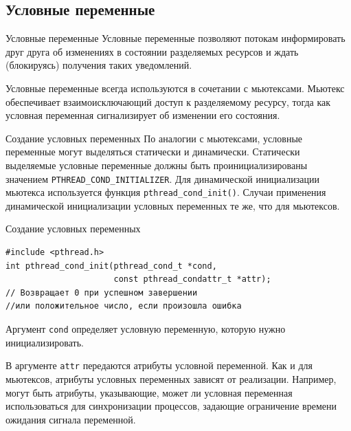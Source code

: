\documentclass{beamer}
\begin{document}
\subsection{Условные переменные}

\begin{frame}{Условные переменные}
    Условные переменные позволяют потокам информировать друг друга об изменениях в состоянии разделяемых ресурсов и ждать (блокируясь) получения таких уведомлений.
    
    Условные переменные всегда используются в сочетании с мьютексами. Мьютекс обеспечивает взаимоисключающий доступ к разделяемому ресурсу, тогда как условная переменная сигнализирует об изменении его состояния.
\end{frame}

\begin{frame}{Создание условных переменных}
    По аналогии с мьютексами, условные переменные могут выделяться статически и динамически. Статически выделяемые условные переменные должны быть проинициализированы значением \texttt{PTHREAD\_COND\_INITIALIZER}. Для динамической инициализации мьютекса используется функция \texttt{pthread\_cond\_init()}. Случаи применения динамической инициализации условных переменных те же, что для мьютексов. 
\end{frame}

\begin{frame}[fragile]{Создание условных переменных}
    \begin{verbatim}
#include <pthread.h>
int pthread_cond_init(pthread_cond_t *cond, 
                      const pthread_condattr_t *attr);
// Возвращает 0 при успешном завершении 
//или положительное число, если произошла ошибка
    \end{verbatim}
    
    Аргумент \texttt{cond} определяет условную переменную, которую нужно инициализировать.
    
    В аргументе \texttt{attr} передаются атрибуты условной переменной. Как и для мьютексов, атрибуты условных переменных зависят от реализации. Например, могут быть атрибуты, указывающие, может ли условная переменная использоваться для синхронизации процессов, задающие ограничение времени ожидания сигнала переменной.
\end{frame}
\end{document}
